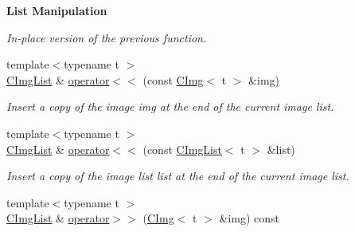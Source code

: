 \begin{Indent}{\bf List Manipulation}
\begin{DoxyCompactItemize}
\begin{DoxyCompactList}\small\item\em In-\/place version of the previous function. \end{DoxyCompactList}\item 
\hypertarget{structcimg__library_1_1_c_img_list_afb8c93505274f0ee60d317298975a883}{{\footnotesize template$<$typename t $>$ }\\\hyperlink{structcimg__library_1_1_c_img_list}{C\-Img\-List} \& \hyperlink{structcimg__library_1_1_c_img_list_afb8c93505274f0ee60d317298975a883}{operator$<$$<$} (const \hyperlink{structcimg__library_1_1_c_img}{C\-Img}$<$ t $>$ \&img)}\label{structcimg__library_1_1_c_img_list_afb8c93505274f0ee60d317298975a883}

\begin{DoxyCompactList}\small\item\em Insert a copy of the image {\ttfamily img} at the end of the current image list. \end{DoxyCompactList}\item 
\hypertarget{structcimg__library_1_1_c_img_list_a071cb7c9c5c6e3239227932f31a67b0a}{{\footnotesize template$<$typename t $>$ }\\\hyperlink{structcimg__library_1_1_c_img_list}{C\-Img\-List} \& \hyperlink{structcimg__library_1_1_c_img_list_a071cb7c9c5c6e3239227932f31a67b0a}{operator$<$$<$} (const \hyperlink{structcimg__library_1_1_c_img_list}{C\-Img\-List}$<$ t $>$ \&list)}\label{structcimg__library_1_1_c_img_list_a071cb7c9c5c6e3239227932f31a67b0a}

\begin{DoxyCompactList}\small\item\em Insert a copy of the image list {\ttfamily list} at the end of the current image list. \end{DoxyCompactList}\item 
\hypertarget{structcimg__library_1_1_c_img_list_a664a1d6cca0682250e3dc54cef60f136}{{\footnotesize template$<$typename t $>$ }\\\hyperlink{structcimg__library_1_1_c_img_list}{C\-Img\-List} \& \hyperlink{structcimg__library_1_1_c_img_list_a664a1d6cca0682250e3dc54cef60f136}{operator$>$$>$} (\hyperlink{structcimg__library_1_1_c_img}{C\-Img}$<$ t $>$ \&img) const }\label{structcimg__library_1_1_c_img_list_a664a1d6cca0682250e3dc54cef60f136}


\end{DoxyCompactItemize}
\end{Indent}

